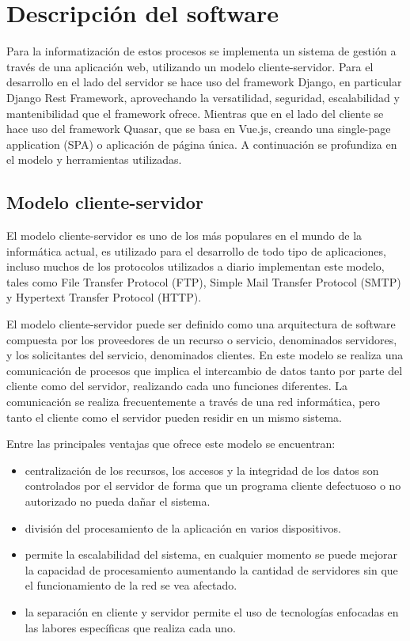 



\section{Descripción del software}
Para la informatización de estos procesos se implementa 
un sistema de gestión a través de una aplicación web,
utilizando un modelo cliente-servidor.
Para el desarrollo en el lado del servidor se hace uso del framework Django, en particular Django Rest Framework, aprovechando la
versatilidad, seguridad, escalabilidad y mantenibilidad
que el framework ofrece.
Mientras que en el lado del cliente se hace uso
del framework Quasar, que se basa en Vue.js, creando una
single-page application (SPA) o aplicación de página única.
A continuación se profundiza en el modelo 
y herramientas utilizadas.

\subsection{Modelo cliente-servidor}
El modelo cliente-servidor es uno de los más populares en
el mundo de la informática actual, es utilizado para el 
desarrollo de todo tipo de aplicaciones, incluso muchos 
de los protocolos utilizados a diario implementan este modelo,
tales como File Transfer Protocol (FTP), Simple Mail Transfer Protocol
(SMTP) y Hypertext Transfer Protocol (HTTP).

El modelo cliente-servidor puede ser definido como una arquitectura
de software compuesta por los proveedores de un recurso o servicio, 
denominados servidores, y los solicitantes del servicio, denominados
clientes. En este modelo se realiza una comunicación de procesos
que implica el intercambio de datos tanto por parte del cliente 
como del servidor, realizando cada uno funciones diferentes. La comunicación
se realiza frecuentemente a través de una red informática, pero 
tanto el cliente como el servidor pueden residir en un mismo sistema.

Entre las principales ventajas que ofrece este modelo se encuentran:

\begin{itemize}
    \item centralización de los recursos, los accesos y la integridad de los datos son controlados por el servidor de forma que un programa cliente defectuoso o no autorizado no pueda dañar el sistema.
    \item división del procesamiento de la aplicación en varios dispositivos.
    \item permite la escalabilidad del sistema, en cualquier momento se puede mejorar la capacidad de procesamiento aumentando la cantidad de servidores sin que el funcionamiento de la red se vea afectado.
    \item la separación en cliente y servidor permite el uso de tecnologías enfocadas en las labores específicas que realiza cada uno. 
\end{itemize}
 


